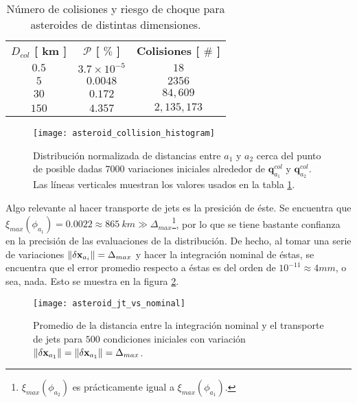 \begin{table}[h!]
\centering
\begin{tabular}{c|c|c}
\toprule
\textbf{$ D_{col}$ [ km ]} & \textbf{$\mathcal{P}$ [ $\%$ ]} & \textbf{Colisiones [ $ \# $ ]} \\ \cmidrule(l){1-3} 
\textbf{$0.5$} &   $3.7 \times 10^{-5}$   & $18$          \\
\textbf{$5$}   &   $0.0048$               & $2356$        \\
\textbf{$30$}  &   $0.172$                & $84,609$     \\
\textbf{$150$} &   $4.357$                & $2,135,173$   \\ \bottomrule 
\end{tabular}
\caption{Número de colisiones y riesgo de choque para asteroides de distintas dimensiones.}
\label{table:collision_table}
\end{table}

\begin{figure}
 \centering
 \texttt{[image: asteroid\_collision\_histogram]}
 \caption{Distribución normalizada de distancias entre $a_1$ y $a_2$ cerca del punto de posible dadas $7000$ variaciones iniciales alrededor de $\mathbf{q}_{a_1}^{col}$ y $\mathbf{q}_{a_2}^{col}$. Las líneas verticales muestran los valores usados en la tabla \ref{table:collision_table}.}
 \label{fig:asteroid_collision_histogram}
\end{figure}


Algo relevante al hacer transporte de jets es la presición de éste. Se encuentra que $\xi_{max}(\phi_{a_1}) = 0.0022 \approx 865 \ km \gg \Delta_{max}$\footnote{$\xi_{max}(\phi_{a_2})$ es prácticamente igual a $\xi_{max}(\phi_{a_1})$.}, por lo que se tiene bastante confianza en la precisión de las evaluaciones de la distribución. De hecho, al tomar una serie de variaciones $\left\lVert\delta\mathbf{x}_{a_i}\right\rVert = \Delta_{max}$ y hacer la integración nominal de éstas, se encuentra que el error promedio respecto a éstas es del orden de $10^{-11} \approx 4 mm$, o sea, nada. Esto se muestra en la figura \ref{fig:asteroid_jt_vs_nominal}.

\begin{figure}
 \centering
 \texttt{[image: asteroid\_jt\_vs\_nominal]}
 \caption{Promedio de la distancia entre la integración nominal y el transporte de jets para $500$ condiciones iniciales con variación $\left\lVert\delta\mathbf{x}_{a_1}\right\rVert = \left\lVert\delta\mathbf{x}_{a_1}\right\rVert = \Delta_{max}$.}
 \label{fig:asteroid_jt_vs_nominal}
\end{figure}

